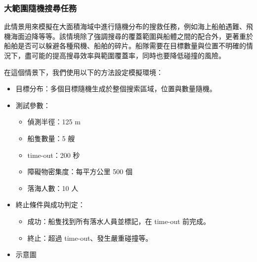 \documentclass[12pt,a4paper]{article}
\begin{document}
\subsubsection{大範圍隨機搜尋任務}
此情景用來模擬在大面積海域中進行隨機分布的搜救任務，例如海上船舶遇難、飛機海面迫降等等。該情境除了強調搜尋的覆蓋範圍與船體之間的配合外，更著重於船舶是否可以躲避各種飛機、船舶的碎片。船隊需要在目標數量與位置不明確的情況下，盡可能的提高搜尋效率與範圍覆蓋率，同時也要降低碰撞的風險。
\\ \par
在這個情景下，我們使用以下的方法設定模擬環境：
\begin{itemize}
    \item 目標分布：多個目標隨機生成於整個搜索區域，位置與數量隨機。
    \item 測試參數：
    \begin{itemize}
        \item 偵測半徑：125 m
        \item 船隻數量：5 艘
        \item time-out：200 秒
        \item 障礙物密集度：每平方公里 500 個
        \item 落海人數：10 人
    \end{itemize}
    \item 終止條件與成功判定：
    \begin{itemize}
        \item 成功：船隻找到所有落水人員並標記，在 time-out 前完成。
        \item 終止：超過 time-out、發生嚴重碰撞等。
    \end{itemize}
    \item 示意圖
\end{itemize}
\end{document}
